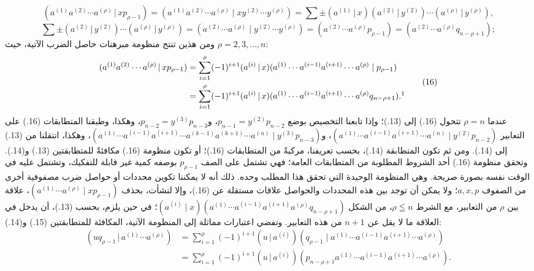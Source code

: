 \documentclass[11pt]{article}
\providecommand{\pair}[2]{(#1\,|\,#2)}
\begin{document}
\[
\pair{a^{(1)}a^{(2)}\cdots a^{(\rho)}}{xp_{\rho-1}}
=(a^{(1)}a^{(2)}\cdots a^{(\rho)}\mid xy^{(2)}\cdots y^{(\rho)})
=\sum\pm\pair{a^{(1)}}{x}\pair{a^{(2)}}{y^{(2)}}\cdots\pair{a^{(\rho)}}{y^{(\rho)}},
\]
\[
\sum\pm\pair{a^{(2)}}{y^{(2)}}\cdots\pair{a^{(\rho)}}{y^{(\rho)}}
=(a^{(2)}\cdots a^{(\rho)}\mid y^{(2)}\cdots y^{(\rho)})
=(a^{(2)}\cdots a^{(\rho)}p_{\rho-1})=(a^{(2)}\cdots a^{(\rho)}q_{n-\rho+1});
\]
ومن هذين تنتج منظومة مبرهنات حاصل الضرب الآتية، حيث $\rho=2,3,\ldots,n$:
\begin{equation}
\begin{aligned}
\pair{a^{(1)}a^{(2)}\cdots a^{(\rho)}}{xp_{\rho-1}}
 &=\sum_{i=1}^{\rho}(-1)^{i+1}\pair{a^{(i)}}{x}(a^{(1)}\cdots a^{(i-1)}a^{(i+1)}\cdots a^{(\rho)}\mid p_{\rho-1})\\
 &=\sum_{i=1}^{\rho}(-1)^{i+1}\pair{a^{(i)}}{x}(a^{(1)}\cdots a^{(i-1)}a^{(i+1)}\cdots a^{(\rho)}q_{n-\rho+1}).\footnotemark
\end{aligned}
\tag{16}
\end{equation}
عندما $\rho=n$ تتحول (16.) إلى (13.)؛ وإذا تابعنا التخصيص بوضع $p_{n-1}=y^{(2)}p_{n-2}$، و$p_{n-2}=y^{(3)}p_{n-3}$، وهكذا، وطبقنا المتطابقات (16.) على التعابير $(a^{(1)}\cdots a^{(i-1)}a^{(i+1)}\cdots a^{(n)}\mid y^{(2)}p_{n-2})$، و$(a^{(1)}\cdots a^{(i-1)}a^{(i+1)}\cdots a^{(k-1)}a^{(k+1)}\cdots a^{(n)}\mid y^{(3)}p_{n-3})$، وهكذا، انتقلنا من (13.) إلى (14.). ومن ثم تكون المتطابقة (14.)، بحسب تعريفنا، مركبةً من المتطابقات (16.)؛ أو تكون منظومة (16.) مكافئةً للمتطابقتين (13.) و(14.). وتحقق منظومة (16.) أحد الشروط المطلوبة من المتطابقات العامة؛ فهي تشتمل على الصف $p_{\rho-1}$ بوصفه كمية غير قابلة للتفكيك، وتشتمل عليه في الوقت نفسه بصورة صريحة. وهي المنظومة الوحيدة التي تحقق هذا المطلب وحده. ذلك أنه لا يمكننا تكوين محددات أو حواصل ضرب مصفوفية أخرى من الصفوف $a,x,p$؛ ولا يمكن أن توجد بين هذه المحددات والحواصل علاقات مستقلة عن (16.)، وإلا لنشأت، بحذف $(a^{(1)}\cdots a^{(\rho)}\mid xp_{\rho-1})$، علاقة بين $\rho$ من التعابير، مع الشرط $\rho\leqq n$، من الشكل $(a^{(i)}\mid x)(a^{(1)}\cdots a^{(i-1)}a^{(i+1)}a^{(\rho)}q_{n-\rho+1})$؛ في حين يلزم، بحسب (13.)، أن يدخل في العلاقة ما لا يقل عن $n+1$ من هذه التعابير. وتفضي اعتبارات مماثلة إلى المنظومة الآتية، المكافئة للمتطابقتين (15.) و(14.):
\begin{equation}
\begin{aligned}
\pair{u q_{\rho-1}}{a^{(1)}\cdots a^{(\rho)}}
 &=\sum_{i=1}^{\rho}(-1)^{i+1}\pair{u}{a^{(i)}}(q_{\rho-1}\mid a^{(1)}\cdots a^{(i-1)}a^{(i+1)}\cdots a^{(\rho)})\\
 &=\sum_{i=1}^{\rho}(-1)^{i+1}\pair{u}{a^{(i)}}(p_{n-\rho+1}a^{(1)}\cdots a^{(i-1)}a^{(i+1)}\cdots a^{(\rho)}).
\end{aligned}
\tag{17}
\end{equation}
\end{document}
